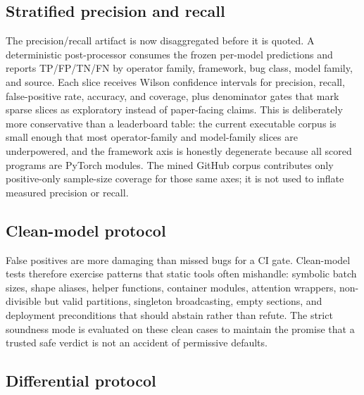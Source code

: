 \documentclass[11pt]{article}
\begin{document}
\subsection{Stratified precision and recall}

The precision/recall artifact is now disaggregated before it is quoted.  A
deterministic post-processor consumes the frozen per-model predictions and
reports TP/FP/TN/FN by operator family, framework, bug class, model family, and
source.  Each slice receives Wilson confidence intervals for precision, recall,
false-positive rate, accuracy, and coverage, plus denominator gates that mark
sparse slices as exploratory instead of paper-facing claims.  This is deliberately
more conservative than a leaderboard table: the current executable corpus is
small enough that most operator-family and model-family slices are underpowered,
and the framework axis is honestly degenerate because all scored programs are
PyTorch modules.  The mined GitHub corpus contributes only positive-only
sample-size coverage for those same axes; it is not used to inflate measured
precision or recall.

\subsection{Clean-model protocol}

False positives are more damaging than missed bugs for a CI gate.  Clean-model
tests therefore exercise patterns that static tools often mishandle: symbolic
batch sizes, shape aliases, helper functions, container modules, attention
wrappers, non-divisible but valid partitions, singleton broadcasting, empty
sections, and deployment preconditions that should abstain rather than refute.
The strict soundness mode is evaluated on these clean cases to maintain the
promise that a trusted safe verdict is not an accident of permissive defaults.

\subsection{Differential protocol}
\end{document}

